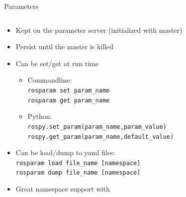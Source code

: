 \documentclass[aspectratio=43]{beamer}
\newcommand{\pyinline}[1]{\texttt{#1}}
\newcommand{\inline}[1]{\texttt{#1}}
\begin{document}
\begin{frame}{Parameters}
	\begin{columns}
		\begin{column}{1.0\textwidth}
			\begin{itemize}
				\item Kept on the parameter server (initialized with master)
				\item Persist until the master is killed
				\item Can be set/get at run time
					\begin{itemize}
						\item Commandline:\\\inline{rosparam set param_name}\\\inline{rosparam get param_name}
						\item Python:\\\pyinline{rospy.set_param(param_name,param_value)}\\\pyinline{rospy.get_param(param_name,default_value)}
					\end{itemize}
				\item Can be load/dump to yaml files:\\\inline{rosparam load file_name [namespace]}\\\inline{rosparam dump file_name [namespace]}
				\item Great namespace support with \inline{~}
			\end{itemize}
		\end{column}
	\end{columns}
\end{frame}
\end{document}
